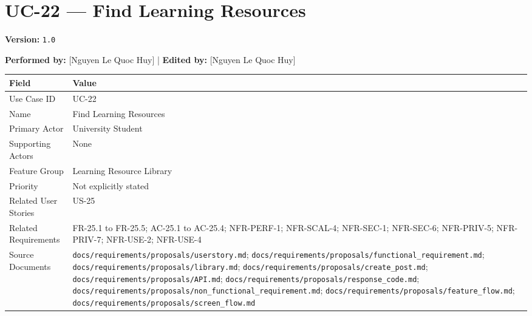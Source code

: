 \documentclass[12pt]{article}
\renewcommand{\baselinestretch}{1.5}
\begin{document}
\pagebreak
\hypertarget{sec:uc-22-find-learning-resources}{}
\section*{UC-22 --- Find Learning Resources}
\par\medskip

\textbf{Version:} \texttt{1.0}
\par\medskip

\textbf{Performed by:} [Nguyen Le Quoc Huy] | \textbf{Edited by:} [Nguyen Le Quoc Huy]
\par\medskip

\begingroup
\small
\renewcommand{\baselinestretch}{1.0}\selectfont
\renewcommand{\arraystretch}{1.15}
\setlength{\tabcolsep}{6pt}
\begin{longtable}{|>{\raggedright\arraybackslash}p{}|>{\raggedright\arraybackslash}p{}|}
\hline
\textbf{Field} & \textbf{Value} \\ \hline
\endhead
Use Case ID & UC-22 \\ \hline
Name & Find Learning Resources \\ \hline
Primary Actor & University Student \\ \hline
Supporting Actors & None \\ \hline
Feature Group & Learning Resource Library \\ \hline
Priority & Not explicitly stated \\ \hline
Related User Stories & US-25 \\ \hline
Related Requirements & FR-25.1 to FR-25.5; AC-25.1 to AC-25.4; NFR-PERF-1; NFR-SCAL-4; NFR-SEC-1; NFR-SEC-6; NFR-PRIV-5; NFR-PRIV-7; NFR-USE-2; NFR-USE-4 \\ \hline
Source Documents & \texttt{docs/requirements/proposals/userstory.md}; \texttt{docs/requirements/proposals/functional\_requirement.md}; \texttt{docs/requirements/proposals/library.md}; \texttt{docs/requirements/proposals/create\_post.md}; \texttt{docs/requirements/proposals/API.md}; \texttt{docs/requirements/proposals/response\_code.md}; \texttt{docs/requirements/proposals/non\_functional\_requirement.md}; \texttt{docs/requirements/proposals/feature\_flow.md}; \texttt{docs/requirements/proposals/screen\_flow.md} \\ \hline
\end{longtable}
\endgroup
\par\medskip
\end{document}
